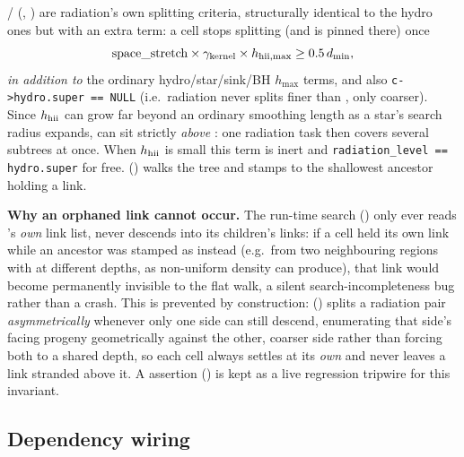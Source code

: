  /
(, ) are radiation's own splitting
criteria, structurally identical to the hydro ones but with an extra
term: a cell stops splitting (and  is pinned
there) once
\begin{equation}
  \text{space\_stretch} \times \gamma_{\rm kernel} \times h_{{\rm hii},\max} \ge 0.5\, d_{\min},
\end{equation}
\emph{in addition to} the ordinary hydro/star/sink/BH $h_{\max}$
terms, and also \texttt{c->hydro.super\allowbreak{} == NULL} (i.e.\ radiation never
splits finer than , only coarser). Since $h_{\rm
hii}$ can grow far beyond an ordinary smoothing length as a star's
search radius expands,  can sit strictly
\emph{above} : one radiation task then covers
several  subtrees at once. When $h_{\rm hii}$ is
small this term is inert and
\texttt{radiation\_level\allowbreak{} == hydro.super} for free. 
() walks the tree and stamps
 to the shallowest ancestor holding
a  link.

\textbf{Why an orphaned link cannot occur.} The run-time search
() only ever
reads 's \emph{own} link list, never descends
into its children's links: if a cell held its own 
link while an ancestor was stamped as  instead
(e.g.\ from two neighbouring regions with  at
different depths, as non-uniform density can produce), that link would
become permanently invisible to the flat walk, a silent
search-incompleteness bug rather than a crash. This is prevented by
construction: 
() splits a radiation pair
\emph{asymmetrically} whenever only one side can still descend,
enumerating that side's facing progeny geometrically against the
other, coarser side rather than forcing both to a shared depth, so
each cell always settles at its \emph{own}  and
never leaves a link stranded above it. A 
assertion () is kept as a live regression tripwire
for this invariant.

\subsection{Dependency wiring}

